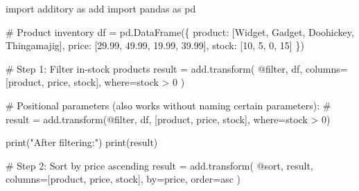 \documentclass[
  letterpaper,
]{scrbook}
\newenvironment{Shaded}{\begin{snugshade}}{\end{snugshade}}
\newcommand{\BuiltInTok}[1]{\textcolor[rgb]{0.00,0.23,0.31}{#1}}
\newcommand{\CommentTok}[1]{\textcolor[rgb]{0.37,0.37,0.37}{#1}}
\newcommand{\DecValTok}[1]{\textcolor[rgb]{0.68,0.00,0.00}{#1}}
\newcommand{\FloatTok}[1]{\textcolor[rgb]{0.68,0.00,0.00}{#1}}
\newcommand{\ImportTok}[1]{\textcolor[rgb]{0.00,0.46,0.62}{#1}}
\newcommand{\NormalTok}[1]{\textcolor[rgb]{0.00,0.23,0.31}{#1}}
\newcommand{\OperatorTok}[1]{\textcolor[rgb]{0.37,0.37,0.37}{#1}}
\newcommand{\StringTok}[1]{\textcolor[rgb]{0.13,0.47,0.30}{#1}}
\begin{document}
\begin{Shaded}
\begin{Highlighting}[]
\ImportTok{import}\NormalTok{ additory }\ImportTok{as}\NormalTok{ add}
\ImportTok{import}\NormalTok{ pandas }\ImportTok{as}\NormalTok{ pd}

\CommentTok{\# Product inventory}
\NormalTok{df }\OperatorTok{=}\NormalTok{ pd.DataFrame(\{}
    \StringTok{\textquotesingle{}product\textquotesingle{}}\NormalTok{: [}\StringTok{\textquotesingle{}Widget\textquotesingle{}}\NormalTok{, }\StringTok{\textquotesingle{}Gadget\textquotesingle{}}\NormalTok{, }\StringTok{\textquotesingle{}Doohickey\textquotesingle{}}\NormalTok{, }\StringTok{\textquotesingle{}Thingamajig\textquotesingle{}}\NormalTok{],}
    \StringTok{\textquotesingle{}price\textquotesingle{}}\NormalTok{: [}\FloatTok{29.99}\NormalTok{, }\FloatTok{49.99}\NormalTok{, }\FloatTok{19.99}\NormalTok{, }\FloatTok{39.99}\NormalTok{],}
    \StringTok{\textquotesingle{}stock\textquotesingle{}}\NormalTok{: [}\DecValTok{10}\NormalTok{, }\DecValTok{5}\NormalTok{, }\DecValTok{0}\NormalTok{, }\DecValTok{15}\NormalTok{]}
\NormalTok{\})}

\CommentTok{\# Step 1: Filter in{-}stock products}
\NormalTok{result }\OperatorTok{=}\NormalTok{ add.transform(}
    \StringTok{\textquotesingle{}@filter\textquotesingle{}}\NormalTok{,}
\NormalTok{    df,}
\NormalTok{    columns}\OperatorTok{=}\NormalTok{[}\StringTok{\textquotesingle{}product\textquotesingle{}}\NormalTok{, }\StringTok{\textquotesingle{}price\textquotesingle{}}\NormalTok{, }\StringTok{\textquotesingle{}stock\textquotesingle{}}\NormalTok{],}
\NormalTok{    where}\OperatorTok{=}\StringTok{\textquotesingle{}stock \textgreater{} 0\textquotesingle{}}
\NormalTok{)}

\CommentTok{\# Positional parameters (also works without naming certain parameters):}
\CommentTok{\# result = add.transform(\textquotesingle{}@filter\textquotesingle{}, df, [\textquotesingle{}product\textquotesingle{}, \textquotesingle{}price\textquotesingle{}, \textquotesingle{}stock\textquotesingle{}], where=\textquotesingle{}stock \textgreater{} 0\textquotesingle{})}

\BuiltInTok{print}\NormalTok{(}\StringTok{"After filtering:"}\NormalTok{)}
\BuiltInTok{print}\NormalTok{(result)}

\CommentTok{\# Step 2: Sort by price ascending}
\NormalTok{result }\OperatorTok{=}\NormalTok{ add.transform(}
    \StringTok{\textquotesingle{}@sort\textquotesingle{}}\NormalTok{,}
\NormalTok{    result,}
\NormalTok{    columns}\OperatorTok{=}\NormalTok{[}\StringTok{\textquotesingle{}product\textquotesingle{}}\NormalTok{, }\StringTok{\textquotesingle{}price\textquotesingle{}}\NormalTok{, }\StringTok{\textquotesingle{}stock\textquotesingle{}}\NormalTok{],}
\NormalTok{    by}\OperatorTok{=}\StringTok{\textquotesingle{}price\textquotesingle{}}\NormalTok{,}
\NormalTok{    order}\OperatorTok{=}\StringTok{\textquotesingle{}asc\textquotesingle{}}
\NormalTok{)}


\end{Highlighting}
\end{Shaded}
\end{document}
